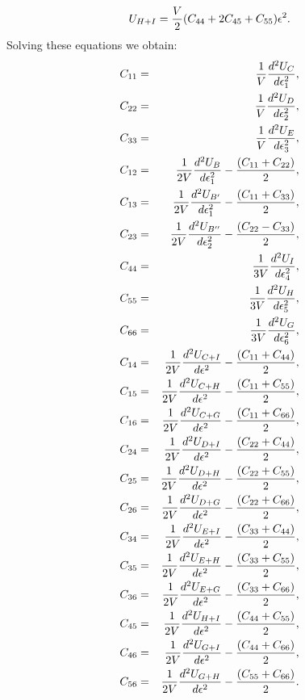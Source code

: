 \documentclass[12pt,a4paper]{article}
\begin{document}
\begin{equation}
U_{H+I}= {V \over 2} (C_{44}+2 C_{45} + C_{55}) \epsilon^2.
\end{equation}
Solving these equations we obtain:
\begin{eqnarray}
C_{11}&=&{1 \over V} {d^2 U_C \over d \epsilon_1^2}, \\ 
C_{22}&=&{1 \over V} {d^2 U_D \over d \epsilon_2^2}, \\ 
C_{33}&=&{1 \over V} {d^2 U_E \over d \epsilon_3^2}, \\ 
C_{12}&=&{1 \over 2 V} {d^2 U_B \over d \epsilon_1^2} - 
                             {(C_{11}+ C_{22})\over 2}, \\
C_{13}&=&{1 \over 2 V} {d^2 U_{B'} \over d \epsilon_1^2} - 
                             {(C_{11} + C_{33})\over 2}, \\
C_{23}&=&{1 \over 2 V} {d^2 U_{B''} \over d \epsilon_2^2} - 
                             {(C_{22} - C_{33})\over 2}, \\
C_{44}&=&{1 \over 3 V} {d^2 U_I \over d \epsilon_4^2}, \\
C_{55}&=&{1 \over 3 V} {d^2 U_H \over d \epsilon_5^2}, \\
C_{66}&=&{1 \over 3 V} {d^2 U_G \over d \epsilon_6^2}, \\
C_{14}&=&{1 \over 2 V} {d^2 U_{C+I} \over d \epsilon^2} - {(C_{11} + C_{44})\over 2}, \\
C_{15}&=&{1 \over 2 V} {d^2 U_{C+H} \over d \epsilon^2} - {(C_{11} + C_{55})\over 2}, \\
C_{16}&=&{1 \over 2 V} {d^2 U_{C+G} \over d \epsilon^2} - {(C_{11} + C_{66})\over 2}, \\
C_{24}&=&{1 \over 2 V} {d^2 U_{D+I} \over d \epsilon^2} - {(C_{22} + C_{44})\over 2}, \\
C_{25}&=&{1 \over 2 V} {d^2 U_{D+H} \over d \epsilon^2} - {(C_{22} + C_{55})\over 2}, \\
C_{26}&=&{1 \over 2 V} {d^2 U_{D+G} \over d \epsilon^2} - {(C_{22} + C_{66})\over 2}, \\
C_{34}&=&{1 \over 2 V} {d^2 U_{E+I} \over d \epsilon^2} - {(C_{33} + C_{44})\over 2}, \\
C_{35}&=&{1 \over 2 V} {d^2 U_{E+H} \over d \epsilon^2} - {(C_{33} + C_{55})\over 2}, \\
C_{36}&=&{1 \over 2 V} {d^2 U_{E+G} \over d \epsilon^2} - {(C_{33} + C_{66})\over 2}, \\
C_{45}&=&{1 \over 2 V} {d^2 U_{H+I} \over d \epsilon^2} - {(C_{44} + C_{55})\over 2}, \\
C_{46}&=&{1 \over 2 V} {d^2 U_{G+I} \over d \epsilon^2} - {(C_{44} + C_{66})\over 2}, \\
C_{56}&=&{1 \over 2 V} {d^2 U_{G+H} \over d \epsilon^2} - {(C_{55} + C_{66})\over 2}.
\end{eqnarray}
\end{document}
